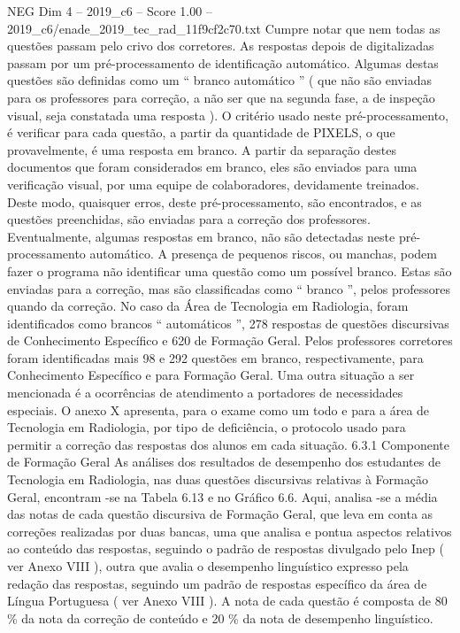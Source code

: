 \begin{textsample}{NEG Dim 4 – 2019\_c6 – Score 1.00 – 2019\_c6/enade\_2019\_tec\_rad\_11f9cf2c70.txt}
Cumpre notar que nem todas as questões passam pelo crivo dos corretores.
As respostas depois de digitalizadas passam por um pré-processamento de identificação automático.
Algumas destas questões são definidas como um “ branco automático ” ( que não são enviadas para os professores para correção, a não ser que na segunda fase, a de inspeção visual, seja constatada uma resposta ).
O critério usado neste pré-processamento, é verificar para cada questão, a partir da quantidade de PIXELS, o que provavelmente, é uma resposta em branco.
A partir da separação destes documentos que foram considerados em branco, eles são enviados para uma verificação visual, por uma equipe de colaboradores, devidamente treinados.
Deste modo, quaisquer erros, deste pré-processamento, são encontrados, e as questões preenchidas, são enviadas para a correção dos professores.
Eventualmente, algumas respostas em branco, não são detectadas neste pré-processamento automático.
A presença de pequenos riscos, ou manchas, podem fazer o programa não identificar uma questão como um possível branco.
Estas são enviadas para a correção, mas são classificadas como “ branco ”, pelos professores quando da correção.
No caso da Área de Tecnologia em Radiologia, foram identificados como brancos “ automáticos ”, 278 respostas de questões discursivas de Conhecimento Específico e 620 de Formação Geral.
Pelos professores corretores foram identificadas mais 98 e 292 questões em branco, respectivamente, para Conhecimento Específico e para Formação Geral.
Uma outra situação a ser mencionada é a ocorrências de atendimento a portadores de necessidades especiais.
O anexo X apresenta, para o exame como um todo e para a área de Tecnologia em Radiologia, por tipo de deficiência, o protocolo usado para permitir a correção das respostas dos alunos em cada situação. 6.3.1 Componente de Formação Geral As análises dos resultados de desempenho dos estudantes de Tecnologia em Radiologia, nas duas questões discursivas relativas à Formação Geral, encontram -se na Tabela 6.13 e no Gráfico 6.6.
Aqui, analisa -se a média das notas de cada questão discursiva de Formação Geral, que leva em conta as correções realizadas por duas bancas, uma que analisa e pontua aspectos relativos ao conteúdo das respostas, seguindo o padrão de respostas divulgado pelo Inep ( ver Anexo VIII ), outra que avalia o desempenho linguístico expresso pela redação das respostas, seguindo um padrão de respostas específico da área de Língua Portuguesa ( ver Anexo VIII ).
A nota de cada questão é composta de 80 \% da nota da correção de conteúdo e 20 \% da nota de desempenho linguístico.

\end{textsample}
